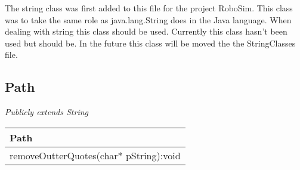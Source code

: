 The string class was first added to this file for the project RoboSim. This class was to take the same role as java.lang.String does in the Java language. When dealing with string this class should be used. Currently this class hasn't been used but should be. In the future this class will be moved the the StringClasses file.

\subsection{Path}
\emph{Publicly extends String}\\
\begin{table}[h]
\begin{tabular}{|l|}\hline
\textbf{Path}\\ \hline
removeOutterQuotes(char* pString):void\\ \hline
\end{tabular}
\end{table}

